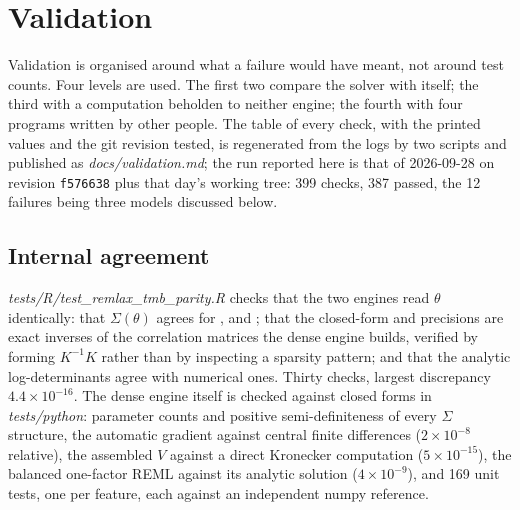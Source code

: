 
\section{Validation}\label{sec:validation}

Validation is organised around what a failure would have meant, not around
test counts. Four levels are used. The first two compare the solver with
itself; the third with a computation beholden to neither engine; the fourth
with four programs written by other people. The table of every check, with
the printed values and the git revision tested, is regenerated from the logs
by two scripts and published as \emph{docs/validation.md}; the run reported
here is that of 2026-09-28 on revision \texttt{f576638} plus that day's
working tree: 399 checks, 387 passed, the 12 failures being three models
discussed below.

\subsection{Internal agreement}

\emph{tests/R/test\_remlax\_tmb\_parity.R} checks that the two engines read
$\theta$ identically: that $\Sigma(\theta)$ agrees for ,
 and ; that the closed-form  and 
precisions are exact inverses of the correlation matrices the dense engine
builds, verified by forming $K^{-1}K$ rather than by inspecting a sparsity
pattern; and that the analytic log-determinants agree with numerical ones.
Thirty checks, largest discrepancy $4.4 \times 10^{-16}$. The dense engine
itself is checked against closed forms in \emph{tests/python}: parameter
counts and positive semi-definiteness of every $\Sigma$ structure, the
automatic gradient against central finite differences ($2 \times 10^{-8}$
relative), the assembled $V$ against a direct Kronecker computation
($5 \times 10^{-15}$), the balanced one-factor REML against its analytic
solution ($4 \times 10^{-9}$), and 169 unit tests, one per feature, each
against an independent numpy reference.

